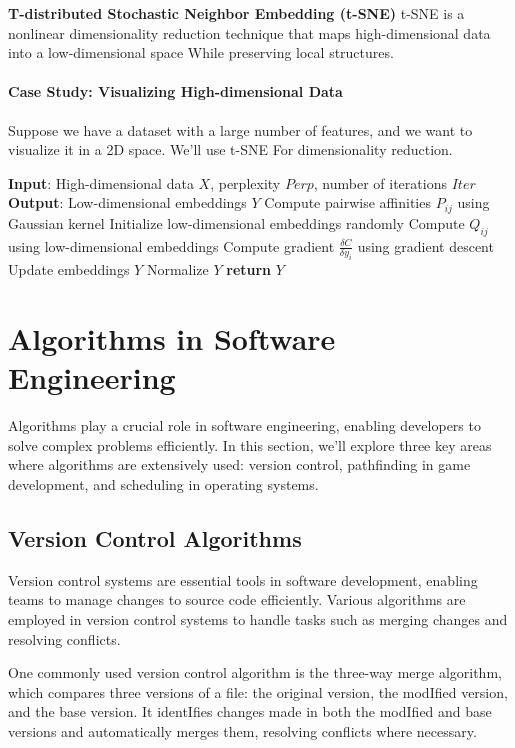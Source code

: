 \documentclass[12pt]{book} %
\begin{document}
\textbf{T-distributed Stochastic Neighbor Embedding (t-SNE)}
t-SNE is a nonlinear dimensionality reduction technique that maps high-dimensional data into a low-dimensional space While preserving local structures.

\paragraph{Case Study: Visualizing High-dimensional Data}
Suppose we have a dataset with a large number of features, and we want to visualize it in a 2D space. We'll use t-SNE For dimensionality reduction.
\FloatBarrier
\begin{algorithm}[H]
\caption{t-SNE}\label{alg:tsne}
\begin{algorithmic}[1]
\State \textbf{Input}: High-dimensional data $X$, perplexity $Perp$, number of iterations $Iter$
\State \textbf{Output}: Low-dimensional embeddings $Y$
\State Compute pairwise affinities $P_{ij}$ using Gaussian kernel
\State Initialize low-dimensional embeddings randomly
    \State Compute $Q_{ij}$ using low-dimensional embeddings
    \State Compute gradient $\frac{\delta C}{\delta y_i}$ using gradient descent
    \State Update embeddings $Y$
    \State Normalize $Y$
\EndFor
\State \textbf{return} $Y$
\end{algorithmic}
\end{algorithm}
\FloatBarrier

\section{Algorithms in Software Engineering}
Algorithms play a crucial role in software engineering, enabling developers to solve complex problems efficiently. In this section, we'll explore three key areas where algorithms are extensively used: version control, pathfinding in game development, and scheduling in operating systems.

\subsection{Version Control Algorithms}
Version control systems are essential tools in software development, enabling teams to manage changes to source code efficiently. Various algorithms are employed in version control systems to handle tasks such as merging changes and resolving conflicts.

One commonly used version control algorithm is the three-way merge algorithm, which compares three versions of a file: the original version, the modIfied version, and the base version. It identIfies changes made in both the modIfied and base versions and automatically merges them, resolving conflicts where necessary.
\end{document}
